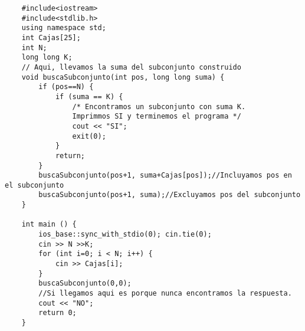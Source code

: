 \newpage
\begin{lstlisting}
	#include<iostream>
	#include<stdlib.h>
	using namespace std;
	int Cajas[25];
	int N;
	long long K;
	// Aqui, llevamos la suma del subconjunto construido
	void buscaSubconjunto(int pos, long long suma) {
		if (pos==N) {
			if (suma == K) {
				/* Encontramos un subconjunto con suma K.
				Imprimmos SI y terminemos el programa */
				cout << "SI";
				exit(0);
			}
			return;
		}
		buscaSubconjunto(pos+1, suma+Cajas[pos]);//Incluyamos pos en el subconjunto
		buscaSubconjunto(pos+1, suma);//Excluyamos pos del subconjunto	
	}
	
	int main () {
		ios_base::sync_with_stdio(0); cin.tie(0);
		cin >> N >>K;
		for (int i=0; i < N; i++) {
			cin >> Cajas[i];
		}
		buscaSubconjunto(0,0);
		//Si llegamos aqui es porque nunca encontramos la respuesta.
		cout << "NO";
		return 0;
	}
\end{lstlisting}
